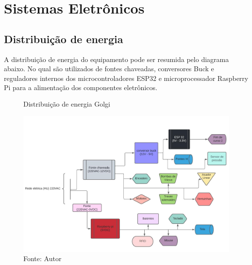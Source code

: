 \documentclass[../poliXuniversity_hospital_(USP)_report.tex]{subfiles}
\begin{document}
\section{Sistemas Eletrônicos}

\subsection{Distribuição de energia}

A distribuição de energia do equipamento pode ser resumida pelo diagrama abaixo. No qual são utilizados de fontes chaveadas, conversores Buck e reguladores internos dos microcontroladores ESP32 e microprocessador Raspberry Pi para a alimentação dos componentes eletrônicos.
\begin{figure}[h]
\centering
    \caption{Distribuição de energia Golgi}
    \centering %
    \includegraphics[width=16cm]{images/distribuição_energia_golgi.jpg}
    \caption*{Fonte: Autor}
    \label{figura:distribuição de energia Golgi}
\end{figure}
\end{document}
